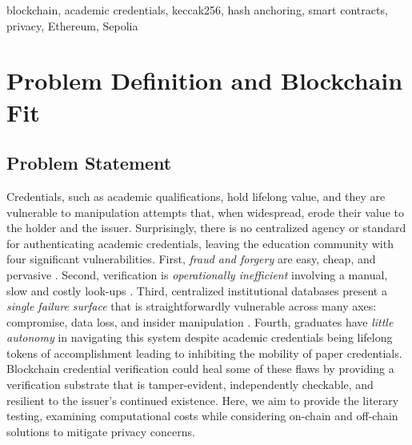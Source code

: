 \documentclass[conference]{IEEEtran}
\begin{document}
\begin{IEEEkeywords}
blockchain, academic credentials, keccak256, hash anchoring, smart contracts, privacy, Ethereum, Sepolia
\end{IEEEkeywords}

\section{Problem Definition and Blockchain Fit}

\subsection{Problem Statement}
Credentials, such as academic qualifications, hold lifelong value, and they are vulnerable to manipulation attempts that, when widespread, erode their value to the holder and the issuer. Surprisingly, there is no centralized agency or standard for authenticating academic credentials, leaving the education community with four significant vulnerabilities. First, \emph{fraud and forgery} are easy, cheap, and pervasive \cite{slr_certificate,cheng_smartcontract}. Second, verification is \emph{operationally inefficient} involving a manual, slow and costly look-ups \cite{capece_trust}. Third, centralized institutional databases present a \emph{single failure surface} that is straightforwardly vulnerable across many axes: compromise, data loss, and insider manipulation \cite{slr_certificate,alhemairy_uae}. Fourth, graduates have \emph{little autonomy} in navigating this system despite academic credentials being lifelong tokens of accomplishment leading to inhibiting the mobility of paper credentials\cite{cheng_smartcontract,capece_trust}. Blockchain credential verification could heal some of these flaws by providing a verification substrate that is tamper-evident, independently checkable, and resilient to the issuer's continued existence. Here, we aim to provide the literary testing, examining computational costs while considering on-chain and off-chain solutions to mitigate privacy concerns.
\end{document}
